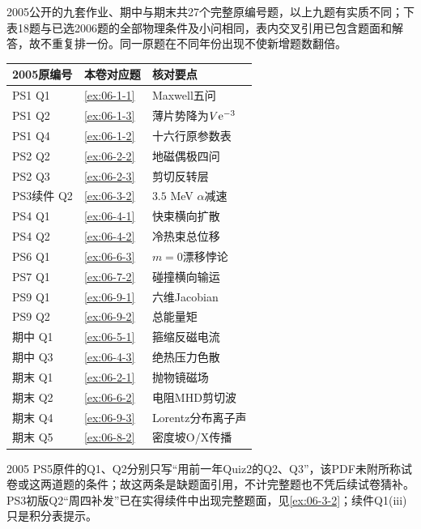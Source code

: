 2005公开的九套作业、期中与期末共27个完整原编号题，以上九题有实质不同；下表18题与已选2006题的全部物理条件及小问相同，表内交叉引用已包含题面和解答，故不重复排一份。同一原题在不同年份出现不使新增题数翻倍。
\begin{center}\small\begin{longtable}{lll}
\toprule 2005原编号&本卷对应题&核对要点\\\midrule
PS1 Q1&\ref{ex:06-1-1}&Maxwell五问\\
PS1 Q2&\ref{ex:06-1-3}&薄片势降为$V\mathrm e^{-3}$\\
PS1 Q4&\ref{ex:06-1-2}&十六行原参数表\\
PS2 Q2&\ref{ex:06-2-2}&地磁偶极四问\\
PS2 Q3&\ref{ex:06-2-3}&剪切反转层\\
PS3续件 Q2&\ref{ex:06-3-2}&$3.5$ MeV $\alpha$减速\\
PS4 Q1&\ref{ex:06-4-1}&快束横向扩散\\
PS4 Q2&\ref{ex:06-4-2}&冷热束总位移\\
PS6 Q1&\ref{ex:06-6-3}&$m=0$漂移悖论\\
PS7 Q1&\ref{ex:06-7-2}&碰撞横向输运\\
PS9 Q1&\ref{ex:06-9-1}&六维Jacobian\\
PS9 Q2&\ref{ex:06-9-2}&总能量矩\\
期中 Q1&\ref{ex:06-5-1}&箍缩反磁电流\\
期中 Q3&\ref{ex:06-4-3}&绝热压力色散\\
期末 Q1&\ref{ex:06-2-1}&抛物镜磁场\\
期末 Q2&\ref{ex:06-6-2}&电阻MHD剪切波\\
期末 Q4&\ref{ex:06-9-3}&Lorentz分布离子声\\
期末 Q5&\ref{ex:06-8-2}&密度坡O/X传播\\\bottomrule
\end{longtable}\end{center}
2005 PS5原件的Q1、Q2分别只写“用前一年Quiz2的Q2、Q3”，该PDF未附所称试卷或这两道题的条件；故这两条是缺题面引用，不计完整题也不凭后续试卷猜补。PS3初版Q2“周四补发”已在实得续件中出现完整题面，见\ref{ex:06-3-2}；续件Q1(iii)只是积分表提示。

